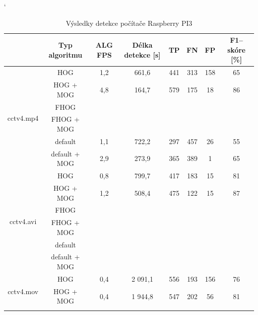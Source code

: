 \begin{table}[H]
\catcode`
\centering
\caption{Výsledky detekce počítače Raspberry PI3}
\label{resultTabRPI3}
\begin{tabular}{|c|c|c|c|c|c|c|c|}
\hline
                         & Typ algoritmu 	& ALG FPS & Délka detekce [s] & TP 		& FN 	& FP 	& F1--skóre [\%]  \\ \hline
\multirow{6}{*}{cctv4.mp4} & HOG         	&   1,2   &   661,6       	  & 441   	& 313     & 158     &    65           \\ \cline{2-8} 
                         & HOG + MOG  		&   4,8   &   164,7       	  & 579		& 175  	& 18   	& 	86	        \\ \cline{2-8} 
                         & FHOG       		&         &   			  &    		&    	&    	& 		        \\ \cline{2-8} 
                         & FHOG + MOG 		&         &               	  &    		&    	&    	& 		        \\ \cline{2-8} 
                         & default	 		&   1,1   &   722,2             & 297   	& 457   	& 26    	&    55 		   \\ \cline{2-8} 
                         & default + MOG 	&   2,9   &   273,9 		  & 365   	& 389    	&  1		&    65           \\ \hline\hline 
\multirow{6}{*}{cctv4.avi} & HOG      		&   0,8   &   799,7        	  & 417   	& 183 	& 15      & 	81	        \\ \cline{2-8} 
                         & HOG + MOG  		&   1,2   &   508,4       	  & 475		& 122 	& 15   	& 	87	        \\ \cline{2-8} 
                         & FHOG       		&         &               	  &    		&    	&    	& 		        \\ \cline{2-8} 
                         & FHOG + MOG 		&         &               	  &    		&    	&    	& 		        \\ \cline{2-8} 
                         & default	 		&         &               	  &    		&    	&    	& 		        \\ \cline{2-8} 
                         & default + MOG 	&         &               	  &    		&    	&    	& 		        \\ \hline \hline
\multirow{6}{*}{cctv4.mov} & HOG      		&   0,4   &   2 091,1      	  & 556 	     & 193 	& 156  	& 	76	        \\ \cline{2-8} 
                         & HOG + MOG  		&   0,4   &   1 944,8      	  & 547		& 202  	& 56	     & 	81	        \\ \cline{2-8} 

\end{tabular}
\end{table}
